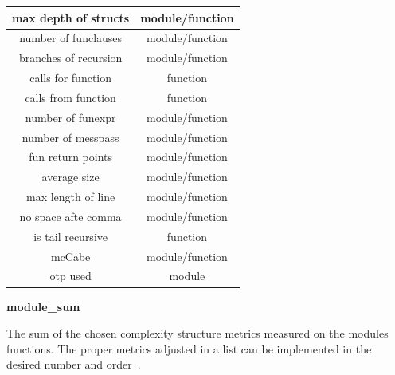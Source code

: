 \begin{table}[!htb]
{\begin{tabular}{|c|c|}
		  	\hline
		  	max depth of structs		& module/function		  			  
		  	\\		  			

		  	\hline
		  	number of funclauses		& module/function		  			  
		  	\\			
	
		  	\hline
		  	branches of recursion		& module/function		  			  
		  	\\			

		  	\hline
		  	calls for function			& function		  			  
		  	\\			
			
		  	\hline
		  	calls from function			& function		  			  
		  	\\	

		  	\hline
		  	number of funexpr			& module/function		  			  
		  	\\
		  	
		  	\hline
		  	number of messpass			& module/function		  			  
		  	\\		  	

		  	\hline
		  	fun return points			& module/function		  			  
		  	\\	
		  	
		  	\hline
		  	average size				& module/function		  			  
		  	\\		  		  	

		  	\hline
		  	max length of line			& module/function		  			  
		  	\\
		  	
		  	\hline
		  	no space afte  comma		& module/function		  			  
		  	\\	
		  	
		  	\hline
		  	is tail recursive			& function		  			  
		  	\\		  	

		  	\hline
		  	mcCabe						& module/function		  			  
		  	\\	
		  			  	
		  	\hline
		  	otp used						& module		  			  
		  	\\			  	
		  	\hline		  		  			  				
		\end{tabular}}
	\end{table}

\textbf{module\_sum}

The sum of the chosen complexity structure metrics measured on the modules functions. The proper metrics adjusted in a list can be implemented in the desired number and order~\cite{refactorerlm}.


